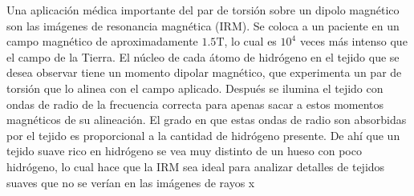 \begin{tcolorbox}[interesting_data, title=Dato curioso]
  Una aplicación médica importante del par de torsión sobre un dipolo magnético son las imágenes de resonancia magnética (IRM). Se coloca a un paciente en un campo magnético de aproximadamente \(1.5 \si{\tesla}\), lo cual es \(10^4\) veces más intenso que el campo de la Tierra. El núcleo de cada átomo de hidrógeno en el tejido que se desea observar tiene un momento dipolar magnético, que experimenta un par de torsión que lo alinea con el campo aplicado. Después se ilumina el tejido con ondas de radio de la frecuencia correcta para apenas sacar a estos momentos magnéticos de su alineación. El grado en que estas ondas de radio son absorbidas por el tejido es proporcional a la cantidad de hidrógeno presente. De ahí que un tejido suave rico en hidrógeno se vea muy distinto de un hueso con poco hidrógeno, lo cual hace que la IRM sea ideal para analizar detalles de tejidos suaves que no se verían en las imágenes de rayos x  
\end{tcolorbox}